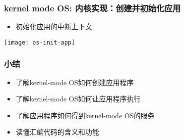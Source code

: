 \begin{frame}
    \frametitle{kernel mode OS: 内核实现：创建并初始化应用}
    
    \begin{itemize}
        \item 初始化应用的中断上下文
    \end{itemize}	
    \centering
    \texttt{[image: os-init-app]}
\end{frame}
\begin{frame}
    \frametitle{小结}
    \begin{itemize}
        \item 了解kernel-mode OS如何创建应用程序
        \item 了解kernel-mode OS如何让应用程序执行
        \item 了解应用程序如何得到kernel-mode OS的服务
        \item 读懂汇编代码的含义和功能
    \end{itemize}
\end{frame}
%
%
%
%		
%		
%	
%
